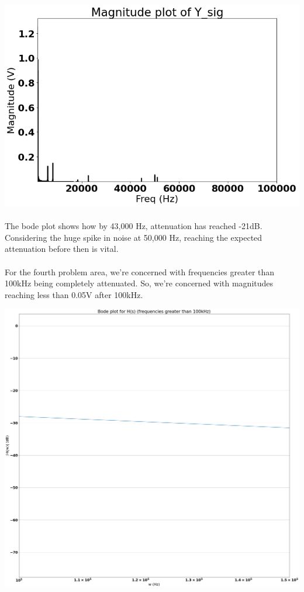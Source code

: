 \documentclass[12pt]{report}
\begin{document}
    \includegraphics[scale = 0.5]{Figure 2022-04-20 163927 (15).png}
    
    \paragraph{} The bode plot shows how by 43,000 Hz, attenuation has reached -21dB. Considering the huge spike in noise at 50,000 Hz, reaching the expected attenuation before then is vital. 
    
    \paragraph{} For the fourth problem area, we're concerned with frequencies greater than 100kHz being completely attenuated. So, we're concerned with magnitudes reaching less than 0.05V after 100kHz.
    
    \includegraphics[scale = 0.2]{Figure 2022-04-20 163927 (10).png}
    
\end{document}
